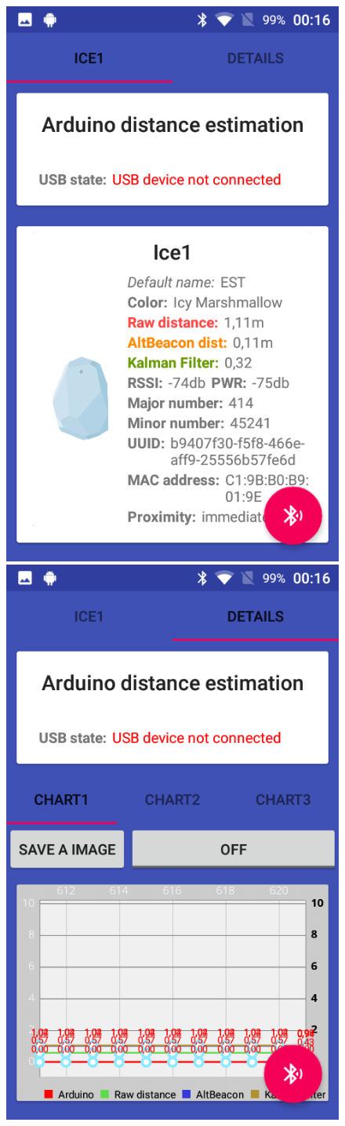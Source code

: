 \begin{figure}[ph]
	\centering
	\includegraphics[width=.37\linewidth]{img/app/07.png}
	\includegraphics[width=.37\linewidth]{img/app/08.png}
	\caption{}
\end{figure}

